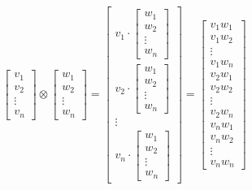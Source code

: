 \documentclass[a4paper]{article}
\numberwithin{equation}{section}
\begin{document}
\begin{equation}
\begin{bmatrix}
	v_1 \\ v_2 \\ \vdots \\ v_n
\end{bmatrix} \otimes
\begin{bmatrix}
	w_1 \\ w_2 \\ \vdots \\ w_n
\end{bmatrix} =
\begin{bmatrix}
	v_1 \cdot \begin{bmatrix}
		w_1 \\ w_2 \\ \vdots \\ w_n
	\end{bmatrix} \\
	v_2 \cdot \begin{bmatrix}
		w_1 \\ w_2 \\ \vdots \\ w_n
	\end{bmatrix} \\
	\vdots \\
	v_n \cdot \begin{bmatrix}
		w_1 \\ w_2 \\ \vdots \\ w_n
	\end{bmatrix}
\end{bmatrix} =
\begin{bmatrix}
v_1w_1 \\ v_1w_2 \\ \vdots \\ v_1w_n \\
v_2w_1 \\ v_2w_2 \\ \vdots \\ v_2w_n \\
v_nw_1 \\ v_nw_2 \\ \vdots \\ v_nw_n
\end{bmatrix}
\end{equation}



\end{document}
